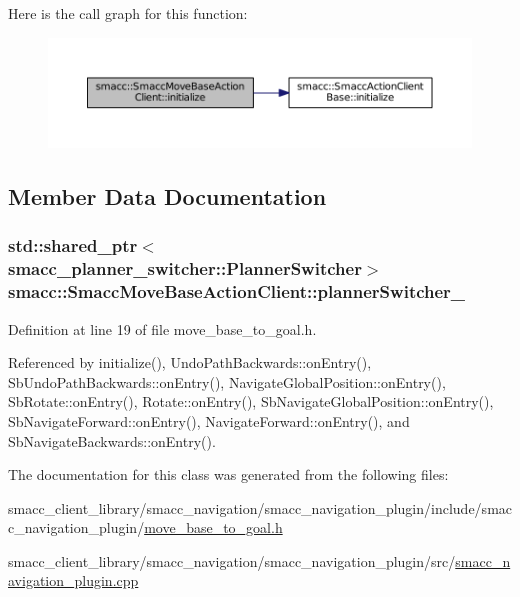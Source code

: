Here is the call graph for this function\+:
\nopagebreak
\begin{figure}[H]
\begin{center}
\leavevmode
\includegraphics[width=350pt]{classsmacc_1_1SmaccMoveBaseActionClient_ae520045638a5f722ad1367f6d705b7c4_cgraph}
\end{center}
\end{figure}




\subsection{Member Data Documentation}
\subsubsection[{\texorpdfstring{planner\+Switcher\+\_\+}{plannerSwitcher_}}]{\setlength{\rightskip}{0pt plus 5cm}std\+::shared\+\_\+ptr$<${\bf smacc\+\_\+planner\+\_\+switcher\+::\+Planner\+Switcher}$>$ smacc\+::\+Smacc\+Move\+Base\+Action\+Client\+::planner\+Switcher\+\_\+}\hypertarget{classsmacc_1_1SmaccMoveBaseActionClient_ae24164268108abf0b35cf51bfba5ec67}{}\label{classsmacc_1_1SmaccMoveBaseActionClient_ae24164268108abf0b35cf51bfba5ec67}


Definition at line 19 of file move\+\_\+base\+\_\+to\+\_\+goal.\+h.



Referenced by initialize(), Undo\+Path\+Backwards\+::on\+Entry(), Sb\+Undo\+Path\+Backwards\+::on\+Entry(), Navigate\+Global\+Position\+::on\+Entry(), Sb\+Rotate\+::on\+Entry(), Rotate\+::on\+Entry(), Sb\+Navigate\+Global\+Position\+::on\+Entry(), Sb\+Navigate\+Forward\+::on\+Entry(), Navigate\+Forward\+::on\+Entry(), and Sb\+Navigate\+Backwards\+::on\+Entry().



The documentation for this class was generated from the following files\+:\begin{DoxyCompactItemize}
\item 
smacc\+\_\+client\+\_\+library/smacc\+\_\+navigation/smacc\+\_\+navigation\+\_\+plugin/include/smacc\+\_\+navigation\+\_\+plugin/\hyperlink{move__base__to__goal_8h}{move\+\_\+base\+\_\+to\+\_\+goal.\+h}\item 
smacc\+\_\+client\+\_\+library/smacc\+\_\+navigation/smacc\+\_\+navigation\+\_\+plugin/src/\hyperlink{smacc__navigation__plugin_8cpp}{smacc\+\_\+navigation\+\_\+plugin.\+cpp}\end{DoxyCompactItemize}
